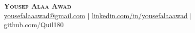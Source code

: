 \documentclass[letterpaper,10pt]{article}
\begin{document}
\begin{center}
    \textbf{\Huge \scshape Yousef Alaa Awad} \\ \vspace{1pt}
    \small \href{mailto:yousefalaaawad@gmail.com}{\underline{yousefalaaawad@gmail.com}} $|$ 
    \href{https://linkedin.com/in/yousefalaaawad}{\underline{linkedin.com/in/yousefalaaawad}} $|$
    \href{https://github.com/Quil180}{\underline{github.com/Quil180}}
\end{center}






\end{document}
